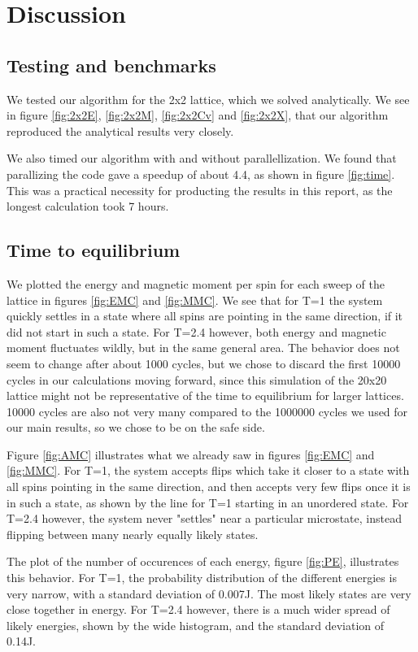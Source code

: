 \documentclass[reprint,english,notitlepage]{revtex4-1}
\begin{document}
	
\section{Discussion} %
\subsection{Testing and benchmarks}
	We tested our algorithm for the 2x2 lattice, which we solved analytically. We see in figure \ref{fig:2x2E}, \ref{fig:2x2M}, \ref{fig:2x2Cv} and \ref{fig:2x2X}, that our algorithm reproduced the analytical results very closely.
	
	We also timed our algorithm with and without parallellization. We found that parallizing the code gave a speedup of about 4.4, as shown in figure \ref{fig:time}. This was a practical necessity for producting the results in this report, as the longest calculation took 7 hours.

\subsection{Time to equilibrium}
	We plotted the energy and magnetic moment per spin for each sweep of the lattice in figures \ref{fig:EMC} and \ref{fig:MMC}. We see that for T=1 the system quickly settles in a state where all spins are pointing in the same direction, if it did not start in such a state. For T=2.4 however, both energy and magnetic moment fluctuates wildly, but in the same general area. The behavior does not seem to change after about 1000 cycles, but we chose to discard the first 10000 cycles in our calculations moving forward, since this simulation of the 20x20 lattice might not be representative of the time to equilibrium for larger lattices. 10000 cycles are also not very many compared to the 1000000 cycles we used for our main results, so we chose to be on the safe side.
	
	Figure \ref{fig:AMC} illustrates what we already saw in figures \ref{fig:EMC} and \ref{fig:MMC}. For T=1, the system accepts flips which take it closer to a state with all spins pointing in the same direction, and then accepts very few flips once it is in such a state, as shown by the line for T=1 starting in an unordered state. For T=2.4 however, the system never "settles" near a particular microstate, instead flipping between many nearly equally likely states.
	
	The plot of the number of occurences of each energy, figure \ref{fig:PE}, illustrates this behavior. For T=1, the probability distribution of the different energies is very narrow, with a standard deviation of 0.007J. The most likely states are very close together in energy. For T=2.4 however, there is a much wider spread of likely energies, shown by the wide histogram, and the standard deviation of 0.14J.
\end{document}
